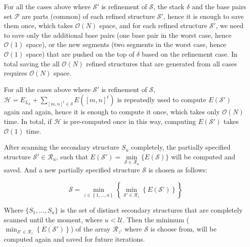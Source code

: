 \begin{remark}\label{remark:spaceE}
	For all the cases above where  $\mathcal{S}'$ is refinement of $\mathcal{S}$,  the stack $\delta$ and the base pairs set $\mathcal{P}$ are parts (common) of each refined structure  $\mathcal{S}'$,  hence it is enough to save them once, which  takes $\mathcal{O}(N)$ space, and for each refined structure $\mathcal{S}'$, we need to save only the additional base pairs (one base pair in the worst case, hence $\mathcal{O}(1)$ space), or the new segments (two segments in the worst case, hence $\mathcal{O}(1)$ space) that are pushed on the top of $\delta$ based on the refinement case. In total saving the all $\mathcal{O}(N)$ refined structures that are generated from all cases requires $\mathcal{O}(N)$ space.   
	
	
\end{remark}  

\begin{remark}\label{remark:timeE}
	For all the cases above where  $\mathcal{S}'$ is refinement of $\mathcal{S}$,  $\mathcal{H} = E_{L_{\mathcal{S}}} + \sum_{[m,n]^t \in \delta} E([m,n]^t)$ 
	is repeatedly used to compute $E(\mathcal{S}')$ again and again, hence it is enough to compute it once, which takes only $\mathcal{O}(N)$ time. 
	In total, if $\mathcal{H}$ is pre-computed once in this way, computing $E(\mathcal{S}')$ takes $\mathcal{O}(1)$ time. 
\end{remark} 


After scanning the secondary structure $S_u$ completely, the partially specified structure $\mathcal{S}' \in \mathcal{R}_u$, such that $E(\mathcal{S}') =  \min\limits_{\mathcal{S} \in \mathcal{R}_u}\{ E(\mathcal{S})\}$ will be computed and saved. And a new partially specified structure $\mathcal{S}$ is chosen as follows:

\begin{equation} \label{eq:newS}
	\mathcal{S} = \min\limits_{z \in \left\{1,\ldots,u\right\}}\left\{\min\limits_{\mathcal{S}' \in \mathcal{R}_z}\left\{ E(\mathcal{S}')\right\}\right\} 
\end{equation}

Where $\{S_1,\ldots,S_u\}$ is the set of distinct secondary structures that are completely scanned until the moment, where $u<\mathcal{U}$. Then the minimum ($\min_{\mathcal{S}' \in \mathcal{R}_z}\left\{ E(\mathcal{S}')\right\}$) of the array $\mathcal{R}_{z'}$ where $\mathcal{S}$ is choose from, will be computed again and saved for future iterations. 

